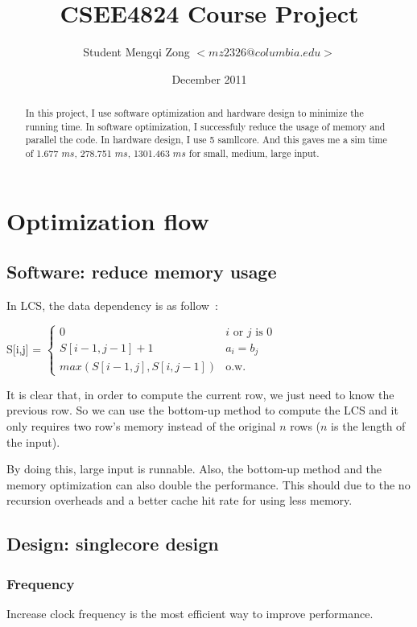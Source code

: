 \documentclass[twocolumn,letterpaper,10pt]{article}
\title{CSEE4824 Course Project}
\author{Student Mengqi Zong $<mz2326@columbia.edu>$}
\date{December 2011}
\begin{document}
\maketitle

\begin{abstract}

  In this project, I use software optimization and hardware design to
  minimize the running time. In software optimization, I successfuly
  reduce the usage of memory and parallel the code. In hardware
  design, I use 5 samllcore. And this gaves me a sim time of 1.677
  $ms$, 278.751 $ms$, 1301.463 $ms$ for small, medium, large input.

\end{abstract}

\section{Optimization flow}

\subsection{Software: reduce memory usage}

In LCS, the data dependency is as follow~\cite{clrs}:

S[i,j] = $
\begin{cases}
  0 & i\text{ or }j\text{ is }0\\
  S[i-1,j-1]+1 & a_i=b_j \\
  max(S[i-1,j],S[i,j-1]) & \text{o.w.}
\end{cases} $

It is clear that, in order to compute the current row, we just need to
know the previous row. So we can use the bottom-up method to compute
the LCS and it only requires two row's memory instead of the original
$n$ rows ($n$ is the length of the input).

By doing this, large input is runnable. Also, the bottom-up method and
the memory optimization can also double the performance. This should
due to the no recursion overheads and a better cache hit rate for
using less memory.

\subsection{Design: singlecore design}

\subsubsection{Frequency}
Increase clock frequency is the most efficient way to improve
performance.
\end{document}
